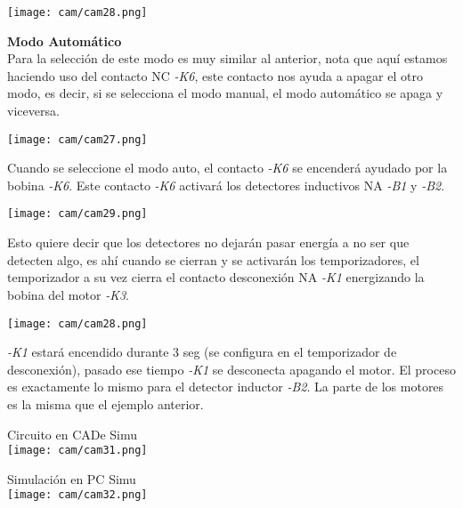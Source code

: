 \documentclass[
	12pt, %
	fleqn, %
	a4paper, %
	oneside, %
]{LegrandOrangeBook}
\begin{document}
\begin{example}
\begin{center}
\texttt{[image: cam/cam28.png]}
\end{center}
\textbf{Modo Automático}\\
Para la selección de este modo es muy similar al anterior, nota que aquí estamos haciendo uso del contacto NC \textit{-K6}, este contacto nos ayuda a apagar el otro modo, es decir, si se selecciona el modo manual, el modo automático se apaga y viceversa.
\begin{center}
\texttt{[image: cam/cam27.png]}
\end{center}
Cuando se seleccione el modo auto, el contacto \textit{-K6} se encenderá ayudado por la bobina \textit{-K6}. Este contacto \textit{-K6} activará los detectores inductivos NA \textit{-B1} y \textit{-B2}. 
\begin{center}
\texttt{[image: cam/cam29.png]}
\end{center}
Esto quiere decir que los detectores no dejarán pasar energía a no ser que detecten algo, es ahí cuando se cierran y se activarán los temporizadores, el temporizador a su vez cierra el contacto desconexión NA \textit{-K1} energizando la bobina del motor \textit{-K3}. 
\begin{center}
\texttt{[image: cam/cam28.png]}
\end{center}
\textit{-K1} estará encendido durante 3 seg (se configura en el temporizador de desconexión), pasado ese tiempo \textit{-K1} se desconecta apagando el motor. El proceso es exactamente lo mismo para el detector inductor \textit{-B2}.
La parte de los motores es la misma que el ejemplo anterior.\\
\begin{center}
Circuito en CADe Simu\\
\texttt{[image: cam/cam31.png]}
\end{center}
\begin{center}
Simulación en PC Simu\\
\texttt{[image: cam/cam32.png]}
\end{center}
\end{example}
\end{document}
